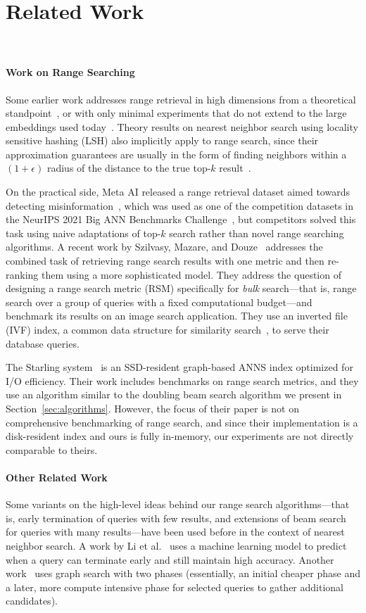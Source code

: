 \section{Related Work}
~\label{sec:relatedwork}

\paragraph{Work on Range Searching} Some earlier work addresses range retrieval in high dimensions from a theoretical standpoint~\cite{chazelle2008approximate}, or with only minimal experiments that do not extend to the large embeddings used today~\cite{wang2013pltree}. Theory results on nearest neighbor search using locality sensitive hashing (LSH) also implicitly apply to range search, since their approximation guarantees are usually in the form of finding neighbors within a $(1+\epsilon)$ radius of the distance to the true top-$k$ result~\cite{indyk1998towards}.

On the practical side, Meta AI released a range retrieval dataset aimed towards detecting misinformation~\cite{simsearchnet}, which was used as one of the competition datasets in the NeurIPS 2021 Big ANN Benchmarks Challenge~\cite{simhadri2021results}, but competitors solved this task using naive adaptations of top-$k$ search rather than novel range searching algorithms. A recent work by Szilvasy, Mazare, and Douze~\cite{szilvasy2024vector} addresses the combined task of retrieving range search results with one metric and then re-ranking them using a more sophisticated model. They address the question of designing a range search metric (RSM) specifically for \textit{bulk} search---that is, range search over a group of queries with a fixed computational budget---and benchmark its results on an image search application. They use an inverted file (IVF) index, a common data structure for similarity search~\cite{douze2024faiss}, to serve their database queries. 

The Starling system~\cite{wang2024starling} is an SSD-resident graph-based ANNS index optimized for I/O efficiency. Their work includes benchmarks on range search metrics, and they use an algorithm similar to the doubling beam search algorithm we present in Section~\ref{sec:algorithms}. However, the focus of their paper is not on comprehensive benchmarking of range search, and since their implementation is a disk-resident index and ours is fully in-memory, our experiments are not directly comparable to theirs. 

\paragraph{Other Related Work} Some variants on the high-level ideas behind our range search algorithms---that is, early termination of queries with few results, and extensions of beam search for queries with many results---have been used before in the context of nearest neighbor search. A work by Li et al.~\cite{li2020improving} uses a machine learning model to predict when a query can terminate early and still maintain high accuracy. Another work~\cite{xu2021twostage} uses graph search with two phases (essentially, an initial cheaper phase and a later, more compute intensive phase for selected queries to gather additional candidates).